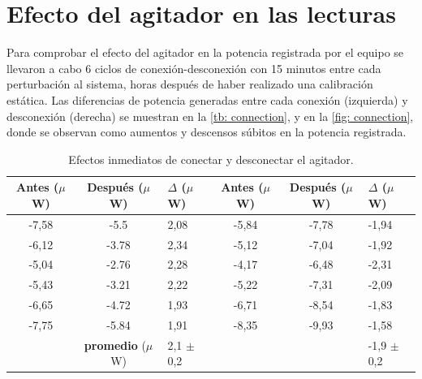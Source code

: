 	\section{Efecto del agitador en las lecturas}
	Para comprobar el efecto del agitador en la potencia registrada por el equipo se llevaron a cabo 6 ciclos de conexión-desconexión con 15 minutos entre cada perturbación al sistema, horas después de haber realizado una calibración estática. Las diferencias de potencia generadas entre cada conexión (izquierda) y desconexión (derecha) se muestran en la \autoref{tb: connection}, y en la \autoref{fig: connection}, donde se observan como aumentos y descensos súbitos en la potencia registrada.
	\begin{table}[h]
		\centering
		\caption{Efectos inmediatos de conectar y desconectar el agitador.}
		\begin{tabular}{cc|l|cc|l}
			\hline
			\textbf{Antes ($\mu$W)} & \textbf{Después ($\mu$W)} &  $\Delta$ ($\mu$W) &  \textbf{Antes ($\mu$W)} & \textbf{Después ($\mu$W)} &  $\Delta$ ($\mu$W) \\
			\hline
			-7,58 &  -5.5 & 2,08 & -5,84 & -7,78 & -1,94 \\
			-6,12 & -3.78 & 2,34 & -5,12 & -7,04 & -1,92 \\
			-5,04 & -2.76 & 2,28 & -4,17 & -6,48 & -2,31 \\
			-5,43 & -3.21 & 2,22 & -5,22 & -7,31 & -2,09 \\
			-6,65 & -4.72 & 1,93 & -6,71 & -8,54 & -1,83 \\
			-7,75 & -5.84 & 1,91 & -8,35 & -9,93 & -1,58 \\
			\hline
			 & \textbf{promedio} ($\mu$W) & 2,1 $\pm$ 0,2 & & & -1,9 $\pm$ 0,2 \\
			\hline
		\end{tabular}
		\label{tb: connection}
	\end{table}


